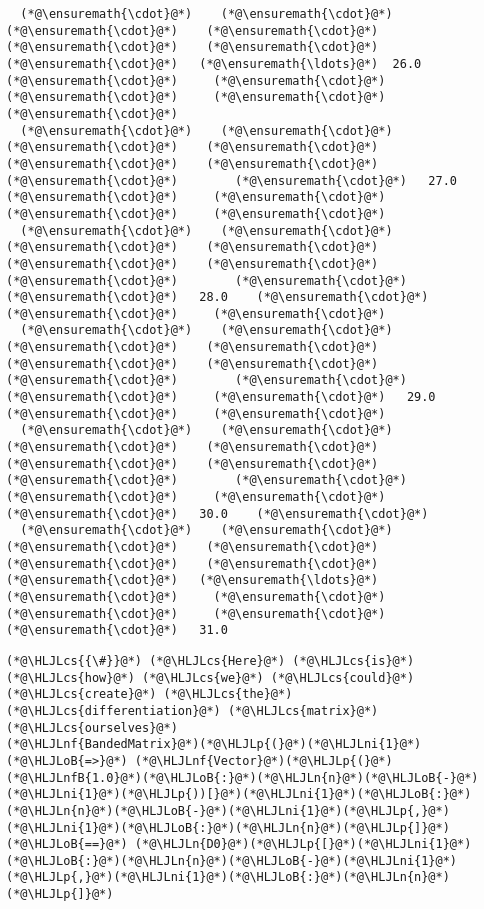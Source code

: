 \documentclass[12pt,landscape]{article}
\newcommand{\HLJLn}[1]{#1}
\newcommand{\HLJLnf}[1]{\textcolor[RGB]{66,102,213}{#1}}
\newcommand{\HLJLnfB}[1]{\textcolor[RGB]{59,151,46}{#1}}
\newcommand{\HLJLni}[1]{\textcolor[RGB]{59,151,46}{#1}}
\newcommand{\HLJLoB}[1]{\textcolor[RGB]{102,102,102}{\textbf{#1}}}
\newcommand{\HLJLp}[1]{#1}
\newcommand{\HLJLcs}[1]{\textcolor[RGB]{153,153,119}{\textit{#1}}}
\begin{document}
{\begin{lstlisting}
  (*@\ensuremath{\cdot}@*)    (*@\ensuremath{\cdot}@*)    (*@\ensuremath{\cdot}@*)    (*@\ensuremath{\cdot}@*)    (*@\ensuremath{\cdot}@*)    (*@\ensuremath{\cdot}@*)    (*@\ensuremath{\cdot}@*)   (*@\ensuremath{\ldots}@*)  26.0    (*@\ensuremath{\cdot}@*)     (*@\ensuremath{\cdot}@*)     (*@\ensuremath{\cdot}@*)     (*@\ensuremath{\cdot}@*)     (*@\ensuremath{\cdot}@*) 
  (*@\ensuremath{\cdot}@*)    (*@\ensuremath{\cdot}@*)    (*@\ensuremath{\cdot}@*)    (*@\ensuremath{\cdot}@*)    (*@\ensuremath{\cdot}@*)    (*@\ensuremath{\cdot}@*)    (*@\ensuremath{\cdot}@*)        (*@\ensuremath{\cdot}@*)   27.0    (*@\ensuremath{\cdot}@*)     (*@\ensuremath{\cdot}@*)     (*@\ensuremath{\cdot}@*)     (*@\ensuremath{\cdot}@*) 
  (*@\ensuremath{\cdot}@*)    (*@\ensuremath{\cdot}@*)    (*@\ensuremath{\cdot}@*)    (*@\ensuremath{\cdot}@*)    (*@\ensuremath{\cdot}@*)    (*@\ensuremath{\cdot}@*)    (*@\ensuremath{\cdot}@*)        (*@\ensuremath{\cdot}@*)     (*@\ensuremath{\cdot}@*)   28.0    (*@\ensuremath{\cdot}@*)     (*@\ensuremath{\cdot}@*)     (*@\ensuremath{\cdot}@*) 
  (*@\ensuremath{\cdot}@*)    (*@\ensuremath{\cdot}@*)    (*@\ensuremath{\cdot}@*)    (*@\ensuremath{\cdot}@*)    (*@\ensuremath{\cdot}@*)    (*@\ensuremath{\cdot}@*)    (*@\ensuremath{\cdot}@*)        (*@\ensuremath{\cdot}@*)     (*@\ensuremath{\cdot}@*)     (*@\ensuremath{\cdot}@*)   29.0    (*@\ensuremath{\cdot}@*)     (*@\ensuremath{\cdot}@*) 
  (*@\ensuremath{\cdot}@*)    (*@\ensuremath{\cdot}@*)    (*@\ensuremath{\cdot}@*)    (*@\ensuremath{\cdot}@*)    (*@\ensuremath{\cdot}@*)    (*@\ensuremath{\cdot}@*)    (*@\ensuremath{\cdot}@*)        (*@\ensuremath{\cdot}@*)     (*@\ensuremath{\cdot}@*)     (*@\ensuremath{\cdot}@*)     (*@\ensuremath{\cdot}@*)   30.0    (*@\ensuremath{\cdot}@*) 
  (*@\ensuremath{\cdot}@*)    (*@\ensuremath{\cdot}@*)    (*@\ensuremath{\cdot}@*)    (*@\ensuremath{\cdot}@*)    (*@\ensuremath{\cdot}@*)    (*@\ensuremath{\cdot}@*)    (*@\ensuremath{\cdot}@*)   (*@\ensuremath{\ldots}@*)    (*@\ensuremath{\cdot}@*)     (*@\ensuremath{\cdot}@*)     (*@\ensuremath{\cdot}@*)     (*@\ensuremath{\cdot}@*)     (*@\ensuremath{\cdot}@*)   31.0
\end{lstlisting}


\begin{lstlisting}
(*@\HLJLcs{{\#}}@*) (*@\HLJLcs{Here}@*) (*@\HLJLcs{is}@*) (*@\HLJLcs{how}@*) (*@\HLJLcs{we}@*) (*@\HLJLcs{could}@*) (*@\HLJLcs{create}@*) (*@\HLJLcs{the}@*) (*@\HLJLcs{differentiation}@*) (*@\HLJLcs{matrix}@*) (*@\HLJLcs{ourselves}@*)
(*@\HLJLnf{BandedMatrix}@*)(*@\HLJLp{(}@*)(*@\HLJLni{1}@*) (*@\HLJLoB{=>}@*) (*@\HLJLnf{Vector}@*)(*@\HLJLp{(}@*)(*@\HLJLnfB{1.0}@*)(*@\HLJLoB{:}@*)(*@\HLJLn{n}@*)(*@\HLJLoB{-}@*)(*@\HLJLni{1}@*)(*@\HLJLp{))[}@*)(*@\HLJLni{1}@*)(*@\HLJLoB{:}@*)(*@\HLJLn{n}@*)(*@\HLJLoB{-}@*)(*@\HLJLni{1}@*)(*@\HLJLp{,}@*)(*@\HLJLni{1}@*)(*@\HLJLoB{:}@*)(*@\HLJLn{n}@*)(*@\HLJLp{]}@*) (*@\HLJLoB{==}@*) (*@\HLJLn{D0}@*)(*@\HLJLp{[}@*)(*@\HLJLni{1}@*)(*@\HLJLoB{:}@*)(*@\HLJLn{n}@*)(*@\HLJLoB{-}@*)(*@\HLJLni{1}@*)(*@\HLJLp{,}@*)(*@\HLJLni{1}@*)(*@\HLJLoB{:}@*)(*@\HLJLn{n}@*)(*@\HLJLp{]}@*)
\end{lstlisting}

}
\end{document}
